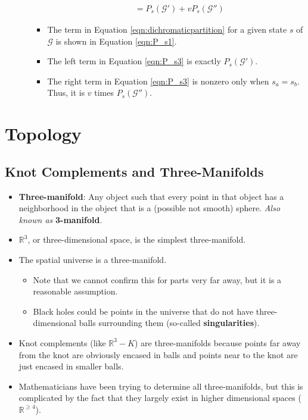 \documentclass[titlepage]{article}
\numberwithin{figure}{section}
\numberwithin{table}{section}
\numberwithin{equation}{section}
\begin{document}
\begin{itemize}
\begin{itemize}
\begin{itemize}
\begin{align*}
                &= P_s(\mathcal{G}')+vP_s(\mathcal{G}'')
            \end{align*}
            \item The term in Equation \ref{eqn:dichromaticpartition} for a given state $s$ of $\mathcal{G}$ is shown in Equation \ref{eqn:P_s1}.
            \item The left term in Equation \ref{eqn:P_s3} is exactly $P_s(\mathcal{G}')$.
            \item The right term in Equation \ref{eqn:P_s3} is nonzero only when $s_a=s_b$. Thus, it is $v$ times $P_s(\mathcal{G}'')$.
        \end{itemize}
    \end{itemize}
\end{itemize}
\newpage



\section{Topology}\label{sse:topology}
\subsection{Knot Complements and Three-Manifolds}
\begin{itemize}
    \item \textbf{Three-manifold}: Any object such that every point in that object has a neighborhood in the object that is a (possible not smooth) sphere. \emph{Also known as} \textbf{3-manifold}.
    \item $\mathbb{R}^3$, or three-dimensional space, is the simplest three-manifold.
    \item The spatial universe is a three-manifold.
    \begin{itemize}
        \item Note that we cannot confirm this for parts very far away, but it is a reasonable assumption.
        \item Black holes could be points in the universe that do not have three-dimensional balls surrounding them (so-called \textbf{singularities}).
    \end{itemize}
    \item Knot complements (like $\mathbb{R}^3-K$) are three-manifolds because points far away from the knot are obviously encased in balls and points near to the knot are just encased in smaller balls.
    \item Mathematicians have been trying to determine all three-manifolds, but this is complicated by the fact that they largely exist in higher dimensional spaces ($\mathbb{R}^{\geq 4}$).
\end{itemize}
\end{document}
